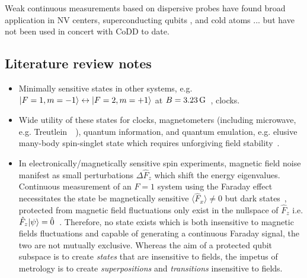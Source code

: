 \documentclass[aps,prl,reprint,superscriptaddress,floatfix]{revtex4-1}
\begin{document}
Weak continuous measurements based on dispersive probes have found broad application in NV centers, superconducting qubits , and cold atoms ... but have not been used in concert with CoDD to date.


\subsection{Literature review notes}
\begin{itemize}
    \item Minimally sensitive states in other systems, e.g. $\vert F=1,m=-1 \rangle  \leftrightarrow \vert F=2,m=+1 \rangle $ at $B=\unit[3.23]{G}$~\cite{matthews_dynamical_1998}, clocks.
    \item Wide utility of these states for clocks, magnetometers (including microwave, e.g. Treutlein~~\cite{ockeloen_quantum_2013,*horsley_frequency-tunable_2016}), quantum information, and quantum emulation, e.g. elusive many-body spin-singlet state which requires unforgiving field stability~\cite{stamper-kurn_spinor_2013}.
    \item In electronically/magnetically sensitive spin experiments, magnetic field noise manifest as small perturbations $\Delta \hat{F}_{z}$ which shift the energy eigenvalues.
    Continuous measurement of an $F=1$ system using the Faraday effect necessitates the state be magnetically sensitive $\langle \hat{F}_x \rangle \neq 0$ but dark states~, protected from magnetic field fluctuations only exist in the nullspace of $\hat{F}_z$ i.e. $\hat{F}_{z}\vert \psi \rangle  = \hat{0}$~\cite{aharon_general_2013}. 
    Therefore, no state exists which is both insensitive to magnetic fields fluctuations and capable of generating a continuous Faraday signal, the two are not mutually exclusive.
    Whereas the aim of a protected qubit subspace is to create \textit{states} that are insensitive to fields, the impetus of metrology is to create \textit{superpositions} and \textit{transitions} insensitive to fields. 


\end{itemize}
\end{document}
